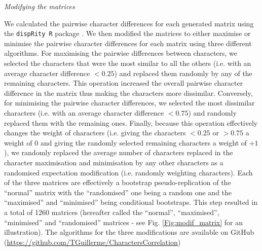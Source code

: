 \documentclass[12pt,letterpaper]{article}
\renewcommand{\subsection}[1]{%
\bigskip
\begin{center}
\begin{large}
\normalfont\itshape #1
\end{large}
\end{center}}
\begin{document}
\subsection{Modifying the matrices}
We calculated the pairwise character differences for each generated matrix using the \texttt{dispRity R} package \citep{thomas_guillerme_2016_55646}.
We then modified the matrices to either maximise or minimise the pairwise character differences for each matrix using three different algorithms.
For maximising the pairwise differences between characters, we selected the characters that were the most similar to all the others (i.e. with an average character difference $<0.25$) and replaced them randomly by any of the remaining characters.
This operation increased the overall pairwise character difference in the matrix thus making the characters more dissimilar.
Conversely, for minimising the pairwise character differences, we selected the most dissimilar characters (i.e. with an average character difference $<0.75$) and randomly replaced them with the remaining ones.
Finally, because this operation effectively changes the weight of characters (i.e. giving the characters $<0.25$ or $>0.75$ a weight of $0$ and giving the randomly selected remaining characters a weight of +$1$), we randomly replaced the average number of characters replaced in the character maximisation and minimisation by any other characters as a randomised expectation modification (i.e. randomly weighting characters).
Each of the three matrices are effectively a bootstrap pseudo-replication of the ``normal'' matrix with the ``randomised'' one being a random one and the ``maximised'' and ``minimised'' being conditional bootstraps.
This step resulted in a total of 1260 matrices (hereafter called the ``normal'', ``maximised'', ``minimised'' and ``randomised'' matrices - see Fig. \ref{Fig:modif_matrix} for an illustration).
The algorithms for the three modifications are available on GitHub (\url{https://github.com/TGuillerme/CharactersCorrelation})
\end{document}
